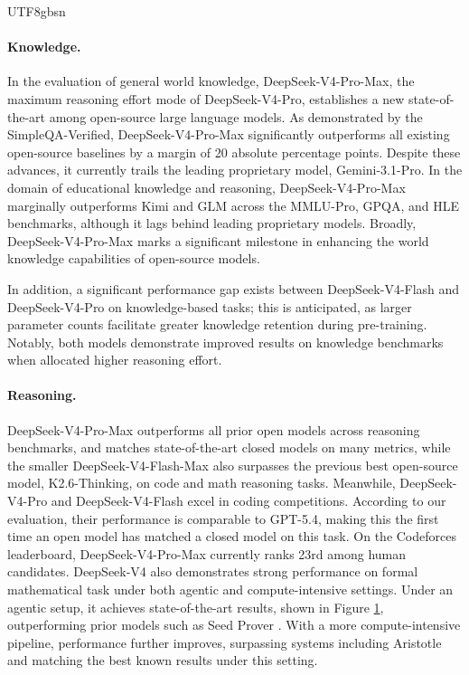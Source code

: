 \documentclass[11pt, a4paper, logo, copyright, nonumbering]{deepseek}
\newcommand{\dsviv}{DeepSeek-V4}
\newcommand{\dsvivp}{DeepSeek-V4-Pro}
\newcommand{\dsvivpm}{DeepSeek-V4-Pro-Max}
\newcommand{\dsvivf}{DeepSeek-V4-Flash}
\newcommand{\dsvivfm}{DeepSeek-V4-Flash-Max}
\begin{document}
\begin{CJK*}{UTF8}{gbsn}
\begin{figure}[t]
    \label{fig:formal-reasoning-overview}
\end{figure}

\paragraph{Knowledge.}
In the evaluation of general world knowledge, \dsvivpm{}, the maximum reasoning effort mode of \dsvivp{}, establishes a new state-of-the-art among open-source large language models. 
As demonstrated by the SimpleQA-Verified, \dsvivpm{} significantly outperforms all existing open-source baselines by a margin of 20 absolute percentage points. 
Despite these advances, it currently trails the leading proprietary model, Gemini-3.1-Pro. 
In the domain of educational knowledge and reasoning, \dsvivpm{} marginally outperforms Kimi and GLM across the MMLU-Pro, GPQA, and HLE benchmarks, although it lags behind leading proprietary models. 
Broadly, \dsvivpm{} marks a significant milestone in enhancing the world knowledge capabilities of open-source models.

In addition, a significant performance gap exists between \dsvivf{} and \dsvivp{} on knowledge-based tasks; this is anticipated, as larger parameter counts facilitate greater knowledge retention during pre-training. 
Notably, both models demonstrate improved results on knowledge benchmarks when allocated higher reasoning effort. 

\paragraph{Reasoning.}
\dsvivpm{} outperforms all prior open models across reasoning benchmarks, and matches state-of-the-art closed models on many metrics, while the smaller \dsvivfm{} also surpasses the previous best open-source model, K2.6-Thinking, on code and math reasoning tasks.
Meanwhile, \dsvivp{} and \dsvivf{} excel in coding competitions. According to our evaluation, their performance is comparable to GPT-5.4, making this the first time an open model has matched a closed model on this task. On the Codeforces leaderboard, \dsvivpm{} currently ranks 23rd among human candidates.
\dsviv{} also demonstrates strong performance on formal mathematical task under both agentic and compute-intensive settings. Under an agentic setup, it achieves state-of-the-art results, shown in Figure \ref{fig:formal-reasoning-overview}, outperforming prior models such as Seed Prover \citep{chen2025seedprover15masteringundergraduatelevel}. With a more compute-intensive pipeline, performance further improves, surpassing systems including Aristotle\citep{achim2025aristotle} and matching the best known results under this setting.


\end{CJK*}
\end{document}
